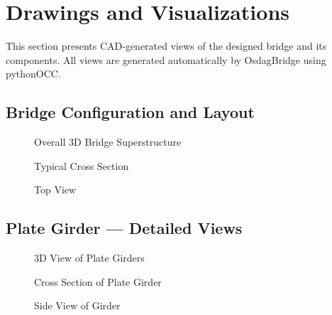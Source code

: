 \documentclass[12pt,a4paper]{report}
\numberwithin{table}{chapter}
\numberwithin{figure}{chapter}
\begin{document}
\chapter{Drawings and Visualizations}
\label{ch:drawings}

This section presents CAD-generated views of the designed bridge and its components. All views are generated automatically by OsdagBridge using pythonOCC.

\section{Bridge Configuration and Layout}
\label{sec:bridge-layout}

\begin{figure}[H]
\centering
{}
\caption{Overall 3D Bridge Superstructure}
\label{fig:bridge-3d}
\end{figure}


\begin{figure}[H]
\centering
{}
\caption{Typical Cross Section}
\label{fig:cross-section}
\end{figure}


\begin{figure}[H]
\centering
{}
\caption{Top View}
\label{fig:top-view}
\end{figure}


\section{Plate Girder --- Detailed Views}
\label{sec:girder-views}

\begin{figure}[H]
\centering
{}
\caption{3D View of Plate Girders}
\label{fig:girder-3d}
\end{figure}


\begin{figure}[H]
\centering
{}
\caption{Cross Section of Plate Girder}
\label{fig:girder-xsec}
\end{figure}


\begin{figure}[H]
\centering
{}
\caption{Side View of Girder}
\label{fig:girder-side}
\end{figure}
\end{document}

